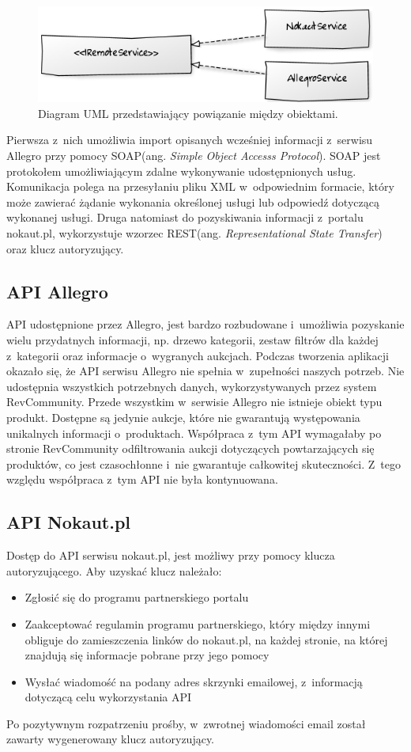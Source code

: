 \begin{figure}[h]
	\centering
	\includegraphics[scale=1]{images/uml_remote_service2.png}
	\caption{Diagram UML przedstawiający powiązanie między obiektami.}
\end{figure}

Pierwsza z~nich umożliwia import opisanych wcześniej informacji z~serwisu Allegro przy pomocy SOAP(ang. \textit{Simple Object Accesss Protocol}). SOAP jest protokołem umożliwiającym zdalne wykonywanie udostępnionych usług. Komunikacja polega na przesyłaniu pliku XML w~odpowiednim formacie, który może zawierać żądanie wykonania określonej usługi lub odpowiedź dotyczącą wykonanej usługi.\cite{soap} \indent Druga natomiast do pozyskiwania informacji z~portalu nokaut.pl, wykorzystuje wzorzec REST(ang. \textit{Representational State Transfer}) oraz klucz autoryzujący.

\subsection{API Allegro}
API udostępnione przez Allegro, jest bardzo rozbudowane i~umożliwia pozyskanie wielu przydatnych informacji, np. drzewo kategorii, zestaw filtrów dla każdej z~kategorii oraz informacje o~wygranych aukcjach.
Podczas tworzenia aplikacji okazało się, że API serwisu Allegro nie spełnia w~zupełności naszych potrzeb.
Nie udostępnia wszystkich potrzebnych danych, wykorzystywanych przez system RevCommunity. Przede wszystkim w~serwisie Allegro nie istnieje obiekt typu produkt. Dostępne są jedynie aukcje, które nie gwarantują występowania unikalnych informacji o~produktach. Współpraca z~tym API wymagałaby po stronie RevCommunity odfiltrowania aukcji dotyczących powtarzających się produktów, co jest czasochłonne i~nie gwarantuje całkowitej skuteczności. Z~tego względu współpraca z~tym API nie była kontynuowana.

\subsection{API Nokaut.pl}
Dostęp do API serwisu nokaut.pl, jest możliwy przy pomocy klucza autoryzującego. Aby uzyskać klucz należało:
\begin{itemize}
\item Zgłosić się do programu partnerskiego portalu
\item Zaakceptować regulamin programu partnerskiego, który między innymi obliguje do zamieszczenia linków do nokaut.pl, na każdej stronie, na której znajdują się informacje pobrane przy jego pomocy
\item Wysłać wiadomość na podany adres skrzynki emailowej, z~informacją dotyczącą celu wykorzystania API
\end{itemize}
Po pozytywnym rozpatrzeniu prośby, w~zwrotnej wiadomości email został zawarty wygenerowany klucz autoryzujący.

